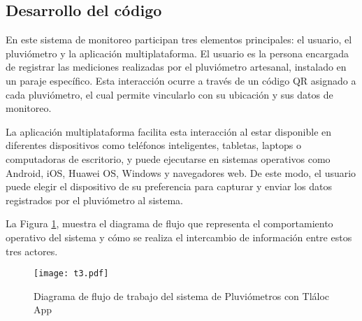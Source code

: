 




































































\subsection{Desarrollo del código}
En este sistema de monitoreo participan tres elementos principales: el usuario, el pluviómetro y la aplicación multiplataforma. El usuario es la persona encargada de registrar las mediciones realizadas por el pluviómetro artesanal, instalado en un paraje específico. Esta interacción ocurre a través de un código QR asignado a cada pluviómetro, el cual permite vincularlo con su ubicación y sus datos de monitoreo.

La aplicación multiplataforma facilita esta interacción al estar disponible en diferentes dispositivos como teléfonos inteligentes, tabletas, laptops o computadoras de escritorio, y puede ejecutarse en sistemas operativos como Android, iOS, Huawei OS, Windows y navegadores web. De este modo, el usuario puede elegir el dispositivo de su preferencia para capturar y enviar los datos registrados por el pluviómetro al sistema.

La Figura \ref{t3}, muestra el diagrama de flujo que representa el comportamiento operativo del sistema y cómo se realiza el intercambio de información entre estos tres actores.
\begin{figure}[h!]
\centering
  \texttt{[image: t3.pdf]}
  \caption{Diagrama de flujo de trabajo del sistema de Pluviómetros con Tláloc App}
  \label{t3}
\end{figure}

